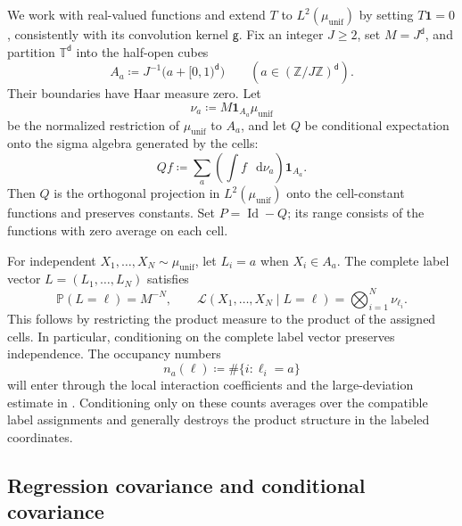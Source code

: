 \documentclass[11pt,reqno]{amsart}
\numberwithin{equation}{section}
\theoremstyle{plain}
\theoremstyle{definition}
\renewcommand{\d}{\mathsf d}
\newcommand{\dd}{\mathop{}\!\mathrm d}
\newcommand{\T}{\mathbb T}
\newcommand{\Z}{\mathbb Z}
\newcommand{\Pb}{\mathbb P}
\newcommand{\Id}{\operatorname{Id}}
\newcommand{\one}{\mathbf 1}
\newcommand{\g}{\mathsf g}
\newcommand{\muunif}{\mu_{\mathrm{unif}}}
\begin{document}
We work with real-valued functions and extend $T$ to $L^2(\muunif)$ by setting $T\one=0$, consistently with its convolution kernel $\g$. Fix an integer $J\geq2$, set $M=J^{\d}$, and partition $\T^{\d}$ into the half-open cubes
\begin{equation}
 A_a\coloneqq J^{-1}\bigl(a+[0,1)^{\d}\bigr)
 \qquad(a\in(\Z/J\Z)^{\d}).
 \label{eq:grid-cells}
\end{equation}
Their boundaries have Haar measure zero.  Let
\begin{equation}
 \nu_a\coloneqq M\one_{A_a}\muunif
 \label{eq:cell-uniform-law}
\end{equation}
be the normalized restriction of $\muunif$ to $A_a$, and let $Q$ be conditional expectation onto the sigma algebra generated by the cells:
\begin{equation}
 Qf\coloneqq\sum_a\left(\int f\,\dd\nu_a\right)\one_{A_a}.
 \label{eq:cell-conditional-expectation}
\end{equation}
Then $Q$ is the orthogonal projection in $L^2(\muunif)$ onto the cell-constant functions and preserves constants. Set $P=\Id-Q$; its range consists of the functions with zero average on each cell.

For independent $X_1,\ldots,X_N\sim\muunif$, let $L_i=a$ when $X_i\in A_a$.  The complete label vector $L=(L_1,\ldots,L_N)$ satisfies
\begin{equation}
 \Pb(L=\ell)=M^{-N},
 \qquad
 \mathcal L(X_1,\ldots,X_N\mid L=\ell)
 =\bigotimes_{i=1}^N\nu_{\ell_i}.
 \label{eq:complete-label-disintegration}
\end{equation}
This follows by restricting the product measure to the product of the assigned cells. In particular, conditioning on the complete label vector preserves independence. The occupancy numbers
\begin{equation}
 n_a(\ell)\coloneqq\#\{i:\ell_i=a\}
 \label{eq:occupancy-numbers}
\end{equation}
will enter through the local interaction coefficients and the large-deviation estimate in . Conditioning only on these counts averages over the compatible label assignments and generally destroys the product structure in the labeled coordinates.

\subsection{Regression covariance and conditional covariance}
\label{subsec:regression-covariance}
\end{document}
